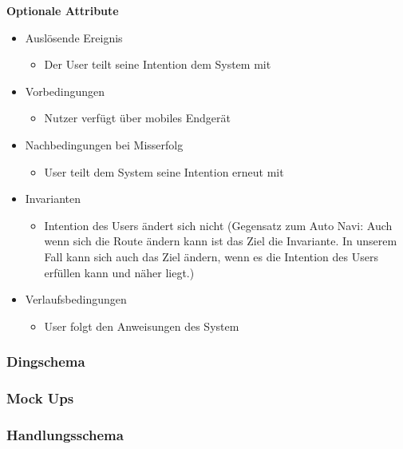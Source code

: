 \textbf{Optionale Attribute}
\begin{itemize}
\item Auslösende Ereignis
    \begin{itemize}
    \item Der User teilt seine Intention dem System mit
    \end{itemize}
\item Vorbedingungen
    \begin{itemize}
    \item Nutzer verfügt über mobiles Endgerät
    \end{itemize}
\item Nachbedingungen bei Misserfolg
    \begin{itemize}
    \item User teilt dem System seine Intention erneut mit
    \end{itemize}
\item Invarianten
    \begin{itemize}
    \item Intention des Users ändert sich nicht (Gegensatz zum Auto Navi: Auch wenn sich die Route ändern kann ist das Ziel die Invariante. In unserem Fall kann sich auch das Ziel ändern, wenn es die Intention des Users erfüllen kann und näher liegt.)
    \end{itemize}
\item Verlaufsbedingungen
    \begin{itemize}
    \item User folgt den Anweisungen des System
    \end{itemize}
\end{itemize}



\subsubsection*{Dingschema}

\subsubsection*{Mock Ups}
\subsubsection*{Handlungsschema}